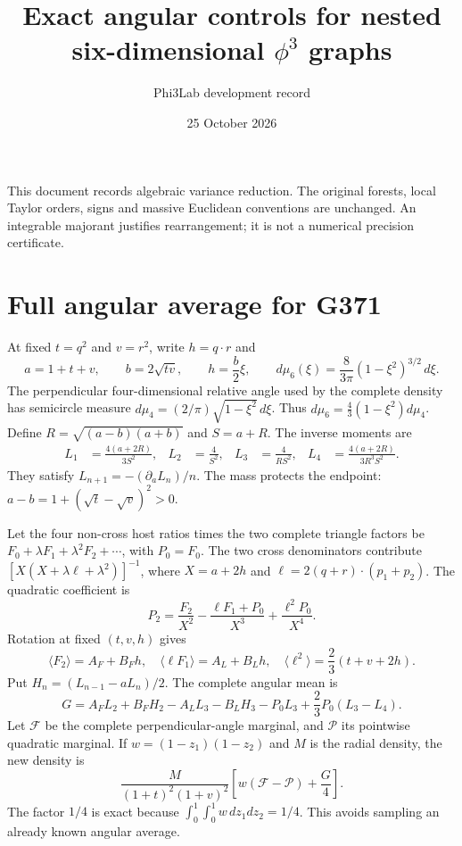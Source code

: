 \documentclass[11pt]{article}
\title{Exact angular controls for nested six-dimensional $\phi^3$ graphs}
\author{Phi3Lab development record}
\date{25 October 2026}
\begin{document}
\maketitle
\noindent This document records algebraic variance reduction. The original forests,
local Taylor orders, signs and massive Euclidean conventions are unchanged.
An integrable majorant justifies rearrangement; it is not a numerical precision certificate.

\section{Full angular average for G371}
At fixed $t=q^2$ and $v=r^2$, write $h=q\cdot r$ and
\[
 a=1+t+v,\qquad b=2\sqrt{tv},\qquad h=\frac b2\xi,\qquad
 d\mu_6(\xi)=\frac{8}{3\pi}(1-\xi^2)^{3/2}\,d\xi .
\]
The perpendicular four-dimensional relative angle used by the complete density
has semicircle measure $d\mu_4=(2/\pi)\sqrt{1-\xi^2}\,d\xi$.
Thus $d\mu_6=\frac43(1-\xi^2)d\mu_4$.
Define $R=\sqrt{(a-b)(a+b)}$ and $S=a+R$. The inverse moments are
\begin{align*}
 L_1&=\frac{4(a+2R)}{3S^2},&
 L_2&=\frac4{S^2},&
 L_3&=\frac4{RS^2},&
 L_4&=\frac{4(a+2R)}{3R^3S^2}.
\end{align*}
They satisfy $L_{n+1}=-(\partial_a L_n)/n$. The mass protects the endpoint:
$a-b=1+(\sqrt t-\sqrt v)^2>0$.

Let the four non-cross host ratios times the two complete triangle factors be
$F_0+\lambda F_1+\lambda^2F_2+\cdots$, with $P_0=F_0$.
The two cross denominators contribute
$[X(X+\lambda\ell+\lambda^2)]^{-1}$, where
$X=a+2h$ and $\ell=2(q+r)\cdot(p_1+p_2)$. The quadratic coefficient is
\[
 P_2=\frac{F_2}{X^2}-\frac{\ell F_1+P_0}{X^3}
       +\frac{\ell^2P_0}{X^4}.
\]
Rotation at fixed $(t,v,h)$ gives
\[
 \langle F_2\rangle=A_F+B_Fh,\quad
 \langle\ell F_1\rangle=A_L+B_Lh,\quad
 \langle\ell^2\rangle=\frac23(t+v+2h).
\]
Put $H_n=(L_{n-1}-aL_n)/2$. The complete angular mean is
\[
 G=A_FL_2+B_FH_2-A_LL_3-B_LH_3-P_0L_3
       +\frac23P_0(L_3-L_4).
\]
Let $\mathcal F$ be the complete perpendicular-angle marginal, and
$\mathcal P$ its pointwise quadratic marginal. If
$w=(1-z_1)(1-z_2)$ and $M$ is the radial density, the new density is
\[
 \frac{M}{(1+t)^2(1+v)^2}
       \left[w(\mathcal F-\mathcal P)+\frac G4\right].
\]
The factor $1/4$ is exact because $\int_0^1\int_0^1w\,dz_1dz_2=1/4$.
This avoids sampling an already known angular average.
\end{document}
